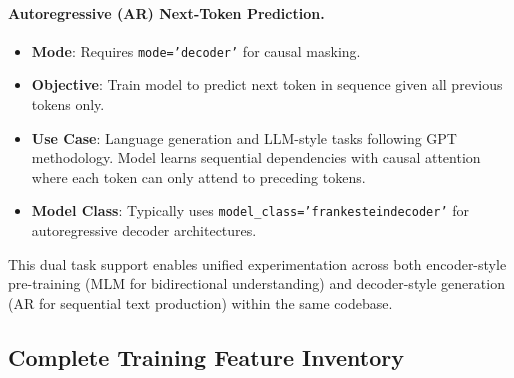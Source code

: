 \paragraph{Autoregressive (AR) Next-Token Prediction.}
\begin{itemize}[leftmargin=*]
    \item \textbf{Mode}: Requires \texttt{mode='decoder'} for causal masking.
    \item \textbf{Objective}: Train model to predict next token in sequence given all previous tokens only.
    \item \textbf{Use Case}: Language generation and LLM-style tasks following GPT methodology. Model learns sequential dependencies with causal attention where each token can only attend to preceding tokens.
    \item \textbf{Model Class}: Typically uses \texttt{model\_class='frankesteindecoder'} for autoregressive decoder architectures.
\end{itemize}

This dual task support enables unified experimentation across both encoder-style pre-training (MLM for bidirectional understanding) and decoder-style generation (AR for sequential text production) within the same codebase.

\subsection{Complete Training Feature Inventory}

